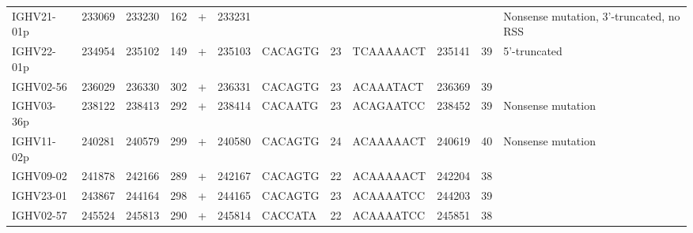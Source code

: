 \begin{tabular}{lrrrlrlllrrl}
  IGHV21-01p & 233069 & 233230 & 162 & + & 233231 &  &  &  &  &  & Nonsense mutation, 3'-truncated, no RSS \\ 
  IGHV22-01p & 234954 & 235102 & 149 & + & 235103 & CACAGTG & 23 & TCAAAAACT & 235141 & 39 & 5'-truncated \\ 
  IGHV02-56 & 236029 & 236330 & 302 & + & 236331 & CACAGTG & 23 & ACAAATACT & 236369 & 39 &  \\ 
  IGHV03-36p & 238122 & 238413 & 292 & + & 238414 & CACAATG & 23 & ACAGAATCC & 238452 & 39 & Nonsense mutation \\ 
  IGHV11-02p & 240281 & 240579 & 299 & + & 240580 & CACAGTG & 24 & ACAAAAACT & 240619 & 40 & Nonsense mutation \\ 
  IGHV09-02 & 241878 & 242166 & 289 & + & 242167 & CACAGTG & 22 & ACAAAAACT & 242204 & 38 &  \\ 
  IGHV23-01 & 243867 & 244164 & 298 & + & 244165 & CACAGTG & 23 & ACAAAATCC & 244203 & 39 &  \\ 
  IGHV02-57 & 245524 & 245813 & 290 & + & 245814 & CACCATA & 22 & ACAAAATCC & 245851 & 38 &  \\ 
   \bottomrule \end{tabular}
